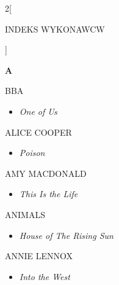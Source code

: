 \documentclass[a4paper]{report}
\begin{document}
\begin{multicols*}{2}[\begin{Huge}INDEKS WYKONAWCW\end{Huge}\vspace{1cm}]\begin{minipage}{\columnwidth}
	\begin{Large}\textbf{A}\end{Large}BBA 
	\begin{itemize}[topsep=3pt, after=\vspace{3mm}]
		\itemsep0em
		\item[]\textit{One of Us}  \\
	\end{itemize}
\end{minipage}
\begin{minipage}{\columnwidth}
	ALICE COOPER 
	\begin{itemize}[topsep=3pt, after=\vspace{3mm}]
		\itemsep0em
		\item[]\textit{Poison}  \\
	\end{itemize}
\end{minipage}
\begin{minipage}{\columnwidth}
	AMY MACDONALD 
	\begin{itemize}[topsep=3pt, after=\vspace{3mm}]
		\itemsep0em
		\item[]\textit{This Is the Life}  \\
	\end{itemize}
\end{minipage}
\begin{minipage}{\columnwidth}
	ANIMALS 
	\begin{itemize}[topsep=3pt, after=\vspace{3mm}]
		\itemsep0em
		\item[]\textit{House of The Rising Sun}  \\
	\end{itemize}
\end{minipage}
\begin{minipage}{\columnwidth}
	ANNIE LENNOX 
	\begin{itemize}[topsep=3pt, after=\vspace{3mm}]
		\itemsep0em
		\item[]\textit{Into the West}  \\
	\end{itemize}

\end{minipage}
\end{multicols*}
\end{document}
